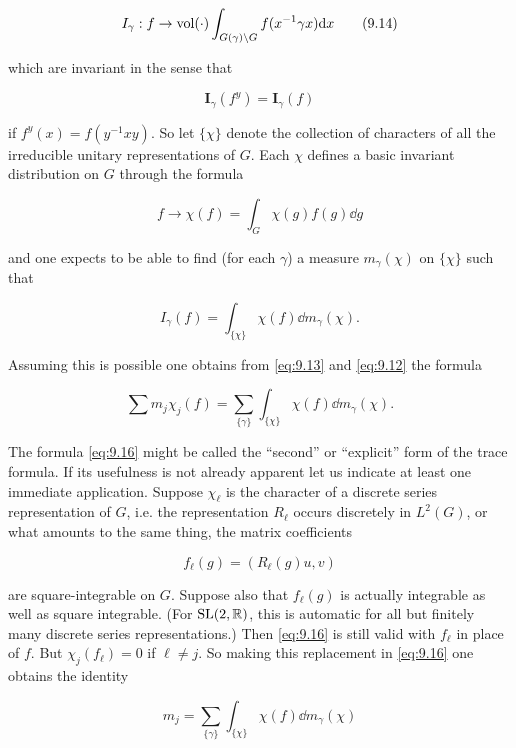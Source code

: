 \begin{equation}\label{eq:9.14}
I_\gamma: f \to \operatorname{vol}(\cdot) \int_{G(\gamma) \backslash G} f(x^{-1}\gamma x)\mathrm{d} x\tag{9.14}
\end{equation}

which are invariant in the sense that

\[
\mathbf{I}_\gamma(f^y) = \mathbf{I}_\gamma(f)
\]

if $f^y(x) = f(y^{-1}xy)$. So let $\{\chi\}$ denote the collection of characters of all the irreducible unitary representations of $G$. Each $\chi$ defines a basic invariant distribution on $G$ through the formula

\[
f \to \chi(f) = \int_G \chi(g)f(g)\dd g
\]

and one expects to be able to find (for each $\gamma$) a measure $m_\gamma(\chi)$ on $\{\chi\}$ such that

\begin{equation}\label{eq:9.15}
I_\gamma(f) = \int_{\{\chi\}} \chi(f)\dd m_\gamma(\chi).\tag{9.15}
\end{equation}

Assuming this is possible one obtains from \eqref{eq:9.13} and \eqref{eq:9.12} the formula

\begin{equation}\label{eq:9.16}
\sum m_j \chi_j(f) = \sum_{\{\gamma\}} \int_{\{\chi\}} \chi(f)\dd m_\gamma(\chi).\tag{9.16}
\end{equation}

The formula \eqref{eq:9.16} might be called the ``second'' or ``explicit'' form of the trace formula. If its usefulness is not already apparent let us indicate at least one immediate application. Suppose $\chi_\ell$ is the character of a discrete series representation of $G$, i.e. the representation $R_\ell$ occurs discretely in $L^2(G)$, or what amounts to the same thing, the matrix coefficients

\[
f_\ell(g) = (R_\ell(g)u, v)
\]

are square-integrable on $G$. Suppose also that $f_\ell(g)$ is actually integrable as well as square integrable. (For $\operatorname{SL}(2,\mathbb{R})$, this is automatic for all but finitely many discrete series representations.) Then \eqref{eq:9.16} is still valid with $f_\ell$ in place of $f$. But $\chi_j(f_\ell) = 0$ if $\ell \neq j$. So making this replacement in \eqref{eq:9.16} one obtains the identity

\begin{equation}\label{eq:9.17}
m_j = \sum_{\{\gamma\}} \int_{\{\chi\}} \chi(f)\dd m_\gamma(\chi)\tag{9.17}
\end{equation}

